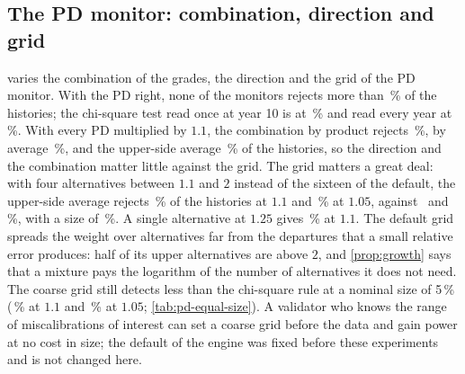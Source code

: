 

\subsection{The PD monitor: combination, direction and grid}
\label{sec:ablation-pd}

 varies the combination of the grades, the direction and the grid of the PD monitor. With the PD right, none of the monitors rejects more than \nPdOneSingle\,\% of the histories; the chi-square test read once at year 10 is at \nPdOneChiOne\,\% and read every year at \nPdOneChiEvery\,\%. With every PD multiplied by $1.1$, the combination by product rejects \nPdOneOneProd\,\%, by average \nPdOneOneAvg\,\%, and the upper-side average \nPdOneOneAvgUp\,\% of the histories, so the direction and the combination matter little against the grid. The grid matters a great deal: with four alternatives between $1.1$ and $2$ instead of the
sixteen of the default, the upper-side average rejects \nPdOneOneCoarse\,\% of the histories at $1.1$ and \nPdOneZeroFiveCoarse\,\% at $1.05$, against \nPdOneOneAvgUp\ and \nPdOneZeroFiveAvgUp\,\%, with a size of \nPdOneCoarse\,\%. A single alternative at $1.25$ gives \nPdOneOneSingle\,\% at $1.1$. The default grid spreads the weight over alternatives far from the departures that a small relative error produces: half of its upper alternatives are above $2$, and
\cref{prop:growth} says that a mixture pays the logarithm of the number of alternatives it does not need. The coarse grid still detects less than the chi-square rule at a nominal size of 5\,\% (\nPdcOneOneChiSim\,\% at $1.1$ and \nPdcOneZeroFiveChiSim\,\% at $1.05$; \cref{tab:pd-equal-size}). A validator who knows the range of miscalibrations of interest can set a coarse grid before the data and gain power at no cost in size; the default of the engine was fixed before these experiments and is not changed here.


